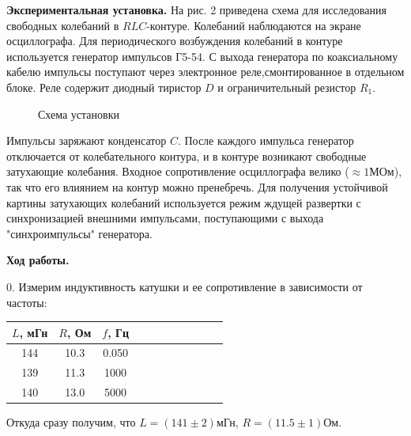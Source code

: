 \documentclass[14pt]{article}
\begin{document}
\textbf{Экспериментальная установка.} На рис. 2 приведена схема для исследования свободных колебаний в $RLC$-контуре. Колебаний наблюдаются на экране осциллографа. Для периодического возбуждения колебаний в контуре используется генератор импульсов Г5-54. С выхода генератора по коаксиальному кабелю импульсы поступают через электронное реле,смонтированное в отдельном блоке. Реле содержит диодный тиристор $D$ и ограничительный резистор $R_1$. 

\begin{figure}[h!]
	\caption{Схема установки}
	\label{fig:image}
\end{figure}

Импульсы заряжают конденсатор $C$. После каждого импульса генератор отключается от колебательного контура, и в контуре возникают свободные затухающие колебания. Входное сопротивление осциллографа велико ($\approx 1$МОм), так что его влиянием на контур можно пренебречь. Для получения устойчивой картины затухающих колебаний используется режим ждущей развертки с синхронизацией внешними импульсами, поступающими с выхода "синхроимпульсы" генератора. 

\vspace{1cm}
\textbf{Ход работы.}

0. Измерим индуктивность катушки и ее сопротивление в зависимости от частоты:

\begin{center}
\begin{tabular}{|c|c|c|c|c|c|c|c|c|c|c|}
\hline
$L$, мГн	&	$R$, Ом		&	$f$, Гц		\\
\hline
144			&	10.3		&	0.050		\\
\hline
139			&	11.3		&	1000		\\
\hline
140			&	13.0		&	5000		\\
\hline
\end{tabular}
\end{center}

Откуда сразу получим, что $L = (141 \pm 2)$мГн, $R = (11.5 \pm 1)$Ом.
\end{document}
